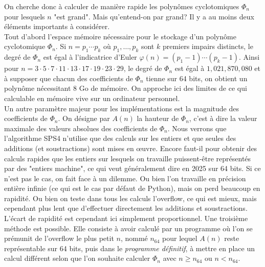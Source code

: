 \documentclass{article}
\newcounter{lemme}
\theoremstyle{break}                  %
\begin{document}
On cherche donc à calculer de manière rapide les polynômes cyclotomiques $\Phi_n$ pour lesquels $n$ "est grand". Mais qu'entend-on par grand? Il y a au moins deux éléments importants à considérer.\\

Tout d'abord l'espace mémoire nécessaire pour le stockage d'un polynôme cyclotomique $\Phi_n$. Si $n = p_1 \cdots p_k$ où $p_1, \dots, p_k$ sont $k$ premiers impairs distincts, le degré de $\Phi_n$ est égal à l'indicatrice d'Euler $\varphi(n) = (p_1-1) \cdots (p_k-1)$. Ainsi pour $n = 3 \cdot 5 \cdot 7 \cdot 11 \cdot 13 \cdot 17 \cdot 19 \cdot 23 \cdot 29$, le degré de $\Phi_n$ est égal à $1,021,870,080$ et à supposer que chacun des coefficients de $\Phi_n$ tienne sur 64 bits, on obtient un polynôme nécessitant 8 Go de mémoire. On approche ici des limites de ce qui calculable en mémoire vive sur un ordinateur personnel.\\

Un autre paramètre majeur pour les implémentations est la magnitude des coefficients de $\Phi_n$. On désigne par $A(n)$ la hauteur de $\Phi_n$, c'est à dire la valeur maximale des valeurs absolues des coefficients de $\Phi_n$. Nous verrons que l'algorithme SPS4 n'utilise que des calculs sur les entiers et que seules des additions (et soustractions) sont mises en œuvre. Encore faut-il pour obtenir des calculs rapides que les entiers sur lesquels on travaille puissent-être représentés par des "entiers machine", ce qui veut généralement dire en 2025 sur 64 bits. Si ce n'est pas le cas, on fait face à un dilemme. Ou bien l'on travaille en précision entière infinie (ce qui est le cas par défaut de Python), mais on perd beaucoup en rapidité. Ou bien on teste dans tous les calculs l'overflow, ce qui est mieux, mais cependant plus lent que d'effectuer directement les additions et soustractions. L'écart de rapidité est cependant ici simplement proportionnel. Une troisième méthode est possible. Elle consiste à avoir calculé par un programme où l'on se prémunit de l'overflow le plus petit $n$, nommé $n_{64}$ pour lequel $A(n)$ reste représentable sur 64 bits, puis dans le \textit{programme définitif}, à mettre en place un calcul différent selon que l'on souhaite calculer $\Phi_n$ avec $n \ge n_{64}$ ou $n < n_{64}$.\\
\end{document}
